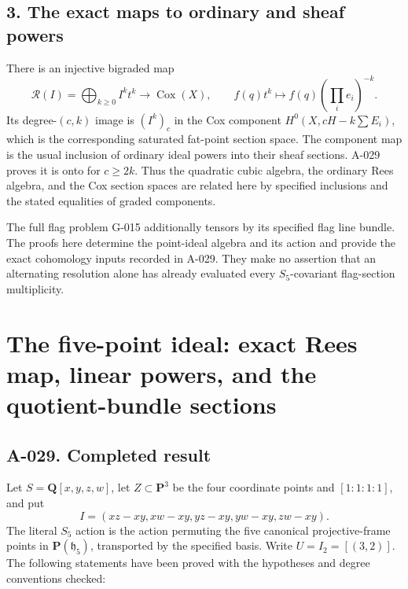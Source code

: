\documentclass[
  10pt,
]{article}
\begin{document}
\subsection{3. The exact maps to ordinary and sheaf
powers}\label{the-exact-maps-to-ordinary-and-sheaf-powers}

There is an injective bigraded map \[
\mathcal R(I)=\bigoplus_{k\ge0}I^k t^k
\longrightarrow\operatorname{Cox}(X),\qquad
f(q)t^k\longmapsto f(q)\left(\prod_i e_i\right)^{-k}.
\] Its degree-\((c,k)\) image is \((I^k)_c\) in the Cox component
\(H^0(X,cH-k\sum E_i)\), which is the corresponding saturated fat-point
section space. The component map is the usual inclusion of ordinary
ideal powers into their sheaf sections. A-029 proves it is onto for
\(c\ge2k\). Thus the quadratic cubic algebra, the ordinary Rees algebra,
and the Cox section spaces are related here by specified inclusions and
the stated equalities of graded components.

The full flag problem G-015 additionally tensors by its specified flag
line bundle. The proofs here determine the point-ideal algebra and its
action and provide the exact cohomology inputs recorded in A-029. They
make no assertion that an alternating resolution alone has already
evaluated every \(S_5\)-covariant flag-section multiplicity.

\section{The five-point ideal: exact Rees map, linear powers, and the
quotient-bundle
sections}\label{the-five-point-ideal-exact-rees-map-linear-powers-and-the-quotient-bundle-sections}

\subsection{A-029. Completed result}\label{a-029.-completed-result}

Let \(S=\mathbf Q[x,y,z,w]\), let \(Z\subset\mathbf P^3\) be the four
coordinate points and \([1:1:1:1]\), and put \[
I=(xz-xy,xw-xy,yz-xy,yw-xy,zw-xy).
\] The literal \(S_5\) action is the action permuting the five canonical
projective-frame points in \(\mathbf P(\mathfrak h_5)\), transported by
the specified basis. Write \(U=I_2=[(3,2)]\). The following statements
have been proved with the hypotheses and degree conventions checked:
\end{document}
